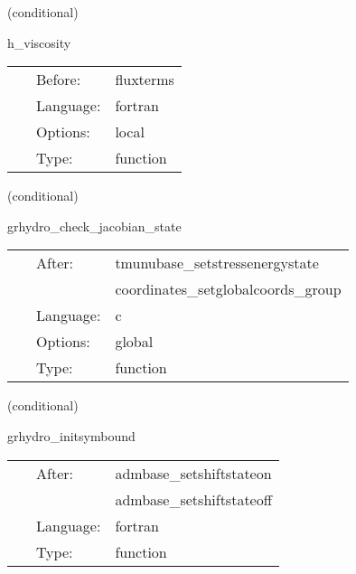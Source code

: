 \documentclass{article}
\begin{document}
   (conditional) 

\hspace{5mm} h\_viscosity 

\hspace{5mm}{\it compute local temporaries for h viscosity } 


\hspace{5mm}

 \begin{tabular*}{160mm}{cll} 
~ & Before:  & fluxterms \\ 
~ & Language:  & fortran \\ 
~ & Options:  & local \\ 
~ & Type:  & function \\ 
\end{tabular*} 


\vspace{5mm}

   (conditional) 

\hspace{5mm} grhydro\_check\_jacobian\_state 

\hspace{5mm}{\it test state of jacobians } 


\hspace{5mm}

 \begin{tabular*}{160mm}{cll} 
~ & After:  & tmunubase\_setstressenergystate \\ 
~& ~ &coordinates\_setglobalcoords\_group\\ 
~ & Language:  & c \\ 
~ & Options:  & global \\ 
~ & Type:  & function \\ 
\end{tabular*} 


\vspace{5mm}

   (conditional) 

\hspace{5mm} grhydro\_initsymbound 

\hspace{5mm}{\it schedule symmetries and check shift state } 


\hspace{5mm}

 \begin{tabular*}{160mm}{cll} 
~ & After:  & admbase\_setshiftstateon \\ 
~& ~ &admbase\_setshiftstateoff\\ 
~ & Language:  & fortran \\ 
~ & Type:  & function \\ 
\end{tabular*} 
\end{document}
